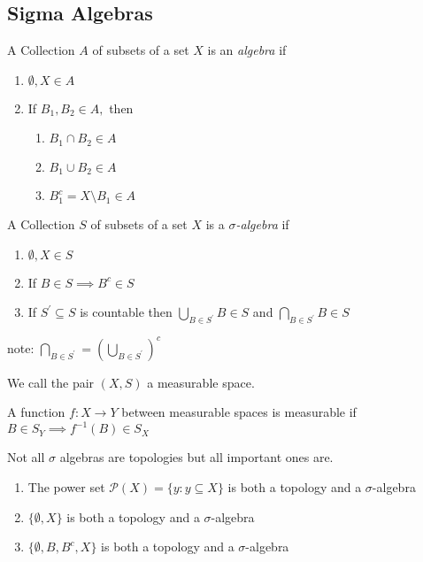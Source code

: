 \subsection{Sigma Algebras}

\begin{definition}[Algebra]
	A Collection $A$ of subsets of a set $X$ is an \emph{algebra} if 
	\begin{enumerate}
		\item $\emptyset, X \in A$
		\item If $B_1, B_2 \in A,$ then
			\begin{enumerate}
				\item $B_1 \cap B_2 \in A$
				\item  $B_1 \cup B_2 \in A$
				\item  $B_1^{c} = X \setminus B_1 \in A$
			\end{enumerate}
	\end{enumerate}
\end{definition}

\begin{definition}
	A Collection $S$ of subsets of a set $X$ is a \emph{$\sigma$-algebra} if 
	\begin{enumerate}
		\item $\emptyset, X \in S$
		\item If $B\in S \implies B^{c} \in S$
		\item If $S^{'} \subseteq S$ is countable then 
			$\bigcup\limits_{B \in S^{'}} B \in S$ and $\bigcap\limits_{B \in S^{'}} B \in S$
	\end{enumerate}
note: $\bigcap\limits_{B \in S^{'}} = (\bigcup\limits_{B \in S^{'}} )^{c}$

We call the pair $(X, S)$ a measurable space.
\end{definition}

\begin{definition}
	A function $f : X \to Y$ between measurable spaces is measurable if $B \in S_Y \implies f^{-1}(B) \in S_X$
\end{definition}

\begin{claim*}
	Not all $\sigma$ algebras are topologies but all important ones are.
\end{claim*}

\begin{example}
	\begin{enumerate}
		\item The power set $\mathcal{P} (X) = \{y : y \subseteq X\}$ is both a topology and a $\sigma$-algebra
		\item $\{\emptyset, X\}$ is both a topology and a $\sigma$-algebra
		\item $\{\emptyset, B, B^{c}, X\}$ is both a topology and a $\sigma$-algebra
	\end{enumerate}
\end{example}

